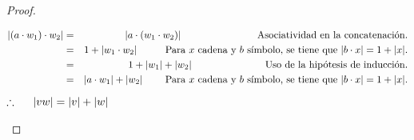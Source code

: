 \documentclass{article}
\begin{document}
\begin{enumerate}
\begin{proof}
\begin{enumerate}
      \begin{eqnarray*}
        |(a \cdot w_{1}) \cdot w_{2}| &=& |a \cdot (w_{1} \cdot w_{2})|
        \hspace*{2.7cm} \text{Asociatividad en la concatenación.} \\
        &=& 1 + |w_{1} \cdot w_{2}|
        \hspace*{1cm} \text{Para $x$ cadena y $b$ símbolo, se tiene que } |b \cdot x| = 1 + |x|. \\
        &=& 1 + |w_{1}| + |w_{2}|
        \hspace*{2.6cm} \text{Uso de la hipótesis de inducción.}\\
        &=& |a \cdot w_{1}| + |w_{2}|
        \hspace*{0.8cm} \text{Para $x$ cadena y $b$ símbolo, se tiene que } |b \cdot x| = 1 + |x|.\\
      \end{eqnarray*}
      \hspace*{4.5cm} $\therefore \hspace*{0.5cm} |vw| = |v| + |w|$
    \end{enumerate}
  \end{proof}
\end{enumerate}
\end{document}
